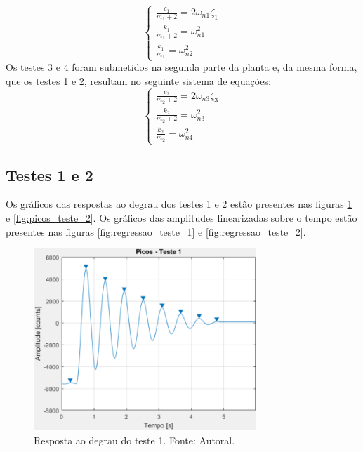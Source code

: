 \documentclass{ifacconf}
\begin{document}
\begin{equation}
  \label{eq:sistema1}
  \left\{
\begin{array}{lr}
  \frac{c_1}{m_1 + 2} = 2\omega_{n1} \zeta_1 \\
  \frac{k_1}{m_1 + 2} = \omega_{n1}^2 \\
  \frac{k_1}{m_1} = \omega_{n2}^2
\end{array}
\right. 
\end{equation}
Os testes 3 e 4 foram submetidos na segunda parte da planta e, da mesma forma, que os testes 1 e 2, resultam no seguinte
sistema de equações:
\begin{equation}
  \label{eq:sistema2}
  \left\{
\begin{array}{lr}
  \frac{c_2}{m_2 + 2} = 2\omega_{n3} \zeta_3 \\
  \frac{k_2}{m_2 + 2} = \omega_{n3}^2 \\
  \frac{k_2}{m_2} = \omega_{n4}^2
\end{array}
\right. 
\end{equation}

\subsection{Testes 1 e 2}
Os gráficos das respostas ao degrau dos testes 1 e 2 estão presentes nas figuras \ref{fig:picos_teste_1} e \ref{fig:picos_teste_2}.
Os gráficos das amplitudes linearizadas sobre o tempo estão presentes nas figuras \ref{fig:regressao_teste_1} e \ref{fig:regressao_teste_2}.
\begin{figure}[!htb]
  \begin{center}
  \includegraphics[width=8.4cm]{figures/picos_teste_1.png}    %
  \caption{Resposta ao degrau do teste 1. Fonte: Autoral.} 
  \label{fig:picos_teste_1}
  \end{center}
\end{figure}
\end{document}
